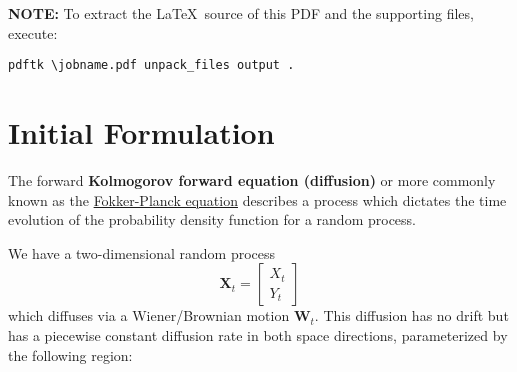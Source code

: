 \documentclass[a4paper,10pt]{article}
\begin{document}
\textbf{NOTE:} To extract the \LaTeX\ source of this PDF and the supporting
files, execute:
\begin{Verbatim}[commandchars=\\\{\}]
pdftk \jobname.pdf unpack_files output .
\end{Verbatim}

\section{Initial Formulation}
The forward \textbf{Kolmogorov forward equation (diffusion)} or more
commonly known as the
\href{http://en.wikipedia.org/wiki/Fokker\%E2\%80\%93Planck_equation\#Many_dimensions}{Fokker-Planck equation}
describes a process which dictates the time evolution of the probability
density function for a random process.

We have a two-dimensional random process
\[\mathbf{X}_t = \left[ \begin{array}{c} X_t \\
Y_t \end{array}\right]\]
which diffuses via a Wiener/Brownian motion \(\mathbf{W}_t\). This diffusion
has no drift but has a piecewise constant diffusion rate in both space
directions, parameterized by the following region:
\begin{center}
\end{center}
\end{document}

